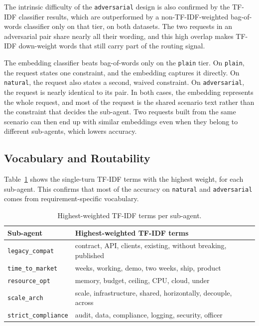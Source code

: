 The intrinsic difficulty of the \texttt{adversarial} design is also confirmed by the TF-IDF classifier results, which are outperformed by a non-TF-IDF-weighted bag-of-words classifier only on that tier, on both datasets. The two requests in an adversarial pair share nearly all their wording, and this high overlap makes TF-IDF down-weight words that still carry part of the routing signal.

The embedding classifier beats bag-of-words only on the \texttt{plain} tier. On \texttt{plain}, the request states one constraint, and the embedding captures it directly. On \texttt{natural}, the request also states a second, waived constraint. On \texttt{adversarial}, the request is nearly identical to its pair. In both cases, the embedding represents the whole request, and most of the request is the shared scenario text rather than the constraint that decides the sub-agent. Two requests built from the same scenario can then end up with similar embeddings even when they belong to different sub-agents, which lowers accuracy.

\subsection{Vocabulary and Routability}
\label{subsec:baseline-vocabulary}

Table~\ref{tab:baseline-terms} shows the single-turn TF-IDF terms with the highest weight, for each sub-agent. This confirms that most of the accuracy on \texttt{natural} and \texttt{adversarial} comes from requirement-specific vocabulary.

\begin{table}[h]
    \centering
    \begin{tabular}{@{}ll@{}}
        \toprule
        \textbf{Sub-agent} & \textbf{Highest-weighted TF-IDF terms} \\
        \midrule
        \texttt{legacy\_compat}     & contract, API, clients, existing, without breaking, published \\
        \texttt{time\_to\_market}       & weeks, working, demo, two weeks, ship, product \\
        \texttt{resource\_opt}      & memory, budget, ceiling, CPU, cloud, under \\
        \texttt{scale\_arch}        & scale, infrastructure, shared, horizontally, decouple, across \\
        \texttt{strict\_compliance} & audit, data, compliance, logging, security, officer \\
        \bottomrule
    \end{tabular}
    \caption[Highest-weighted TF-IDF terms per sub-agent]{Highest-weighted TF-IDF terms per sub-agent.}
    \label{tab:baseline-terms}
\end{table}

